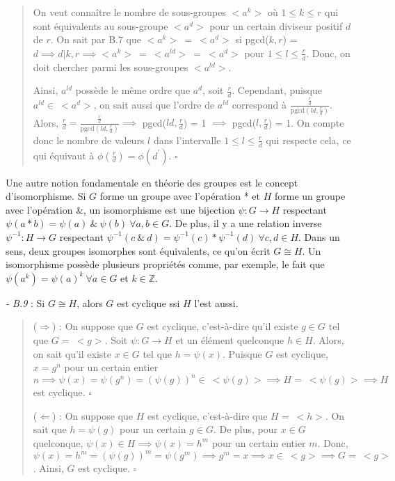 \begin{quote}
    On veut connaître le nombre de sous-groupes $<a^k>$ où $1 \leq k \leq r$ qui sont équivalents au sous-groupe $<a^d>$ pour un certain diviseur positif $d$ de $r$. On sait par B.7 que $<a^k> \ = \ <a^d>$ si pgcd($k,r$) = $d \implies d|k,r \implies  <a^k> \ = \ <a^{ld}> \ = \ <a^d>$ pour $1 \leq l \leq \frac{r}{d}$. Donc, on doit chercher parmi les sous-groupes $<a^{ld}>$.

    Ainsi, $a^{ld}$ possède le même ordre que $a^d$, soit $\frac{r}{d}$. Cependant, puisque $a^{ld} \in \ <a^d>$, on sait aussi que l'ordre de $a^{ld}$ correspond à $\frac{\frac{r}{d}}{\text{pgcd}(ld, \frac{r}{d})}$. Alors, $\frac{r}{d} = \frac{\frac{r}{d}}{\text{pgcd}(ld, \frac{r}{d})} \implies $ pgcd($ld, \frac{r}{d}$) = 1 $\implies$ pgcd($l,\frac{r}{d}$) = 1. On compte donc le nombre de valeurs $l$ dans l'intervalle $1 \leq l \leq \frac{r}{d}$ qui respecte cela, ce qui équivaut à $\phi(\frac{r}{d}) = \phi(d^{'})$. $\square$
\end{quote}

Une autre notion fondamentale en théorie des groupes est le concept d'isomorphisme. Si $G$ forme un groupe avec l'opération * et $H$ forme un groupe avec l'opération \&, un isomorphisme est une bijection $\psi : G \rightarrow H$ respectant $\psi(a*b) = \psi(a) \ \& \ \psi(b) \ \forall a,b \in G$. De plus, il y a une relation inverse $\psi^{-1} : H \rightarrow G$ respectant $\psi^{-1}(c \ \& \ d) = \psi^{-1}(c) * \psi^{-1}(d) \ \forall c,d \in H$. Dans un sens, deux groupes isomorphes sont équivalents, ce qu'on écrit $G \cong H$. Un isomorphisme possède plusieurs propriétés comme, par exemple, le fait que $\psi(a^{k}) = \psi(a)^{k} \ \forall a \in G$ et $k \in \mathbb{Z}$.

\textit{- B.9} : Si $G \cong H$, alors $G$ est cyclique ssi $H$ l'est aussi.

\begin{quote}
    ($\Longrightarrow$) : On suppose que $G$ est cyclique, c'est-à-dire qu'il existe $g \in G$ tel que $G = \ <g>$. Soit $\psi : G \rightarrow H$ et un élément quelconque $h \in H$. Alors, on sait qu'il existe $x \in G$ tel que $h = \psi(x)$. Puisque $G$ est cyclique, $x = g^n$ pour un certain entier $n \implies \psi(x) = \psi(g^n) = \left(\psi(g)\right)^n \in \ <\psi(g)> \implies H = \ <\psi(g)> \implies H$ est cyclique. $\square$ 

    ($\Longleftarrow$) : On suppose que $H$ est cyclique, c'est-à-dire que $H = \ <h>$. On sait que $h = \psi(g)$ pour un certain $g \in G$. De plus, pour $x \in G$ quelconque, $\psi(x) \in H \implies \psi(x) = h^m$ pour un certain entier $m$. Donc, $\psi(x) = h^m = \left(\psi(g)\right)^m = \psi(g^m) \implies g^m = x \implies x \in \ <g> \implies G = \ <g>$. Ainsi, $G$ est cyclique. $\square$
\end{quote}

